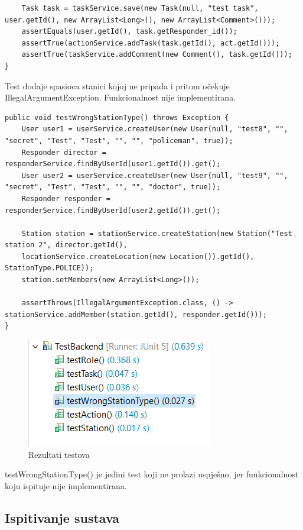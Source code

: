\begin{packed_enum}
\begin{lstlisting}
	Task task = taskService.save(new Task(null, "test task", user.getId(), new ArrayList<Long>(), new ArrayList<Comment>()));
	assertEquals(user.getId(), task.getResponder_id());
	assertTrue(actionService.addTask(task.getId(), act.getId()));
	assertTrue(taskService.addComment(new Comment(), task.getId()));
}
				\end{lstlisting}
				\item Test dodaje spasioca stanici kojoj ne pripada i pritom očekuje IllegalArgumentException. Funkcionalnost nije implementirana.
				\begin{lstlisting}
public void testWrongStationType() throws Exception {
	User user1 = userService.createUser(new User(null, "test8", "", "secret", "Test", "Test", "", "", "policeman", true));
	Responder director = responderService.findByUserId(user1.getId()).get();
	User user2 = userService.createUser(new User(null, "test9", "", "secret", "Test", "Test", "", "", "doctor", true));
	Responder responder = responderService.findByUserId(user2.getId()).get();
	
	Station station = stationService.createStation(new Station("Test station 2", director.getId(),
	locationService.createLocation(new Location()).getId(), StationType.POLICE));
	station.setMembers(new ArrayList<Long>());
	
	assertThrows(IllegalArgumentException.class, () -> stationService.addMember(station.getId(), responder.getId()));
}
				\end{lstlisting}
			\end{packed_enum}
			
			\begin{figure}[H]
				\includegraphics[scale=0.9]{slike/test.png}
				\centering
				\caption{Rezultati testova}
				\label{fig:test}
			\end{figure}
			
			testWrongStationType() je jedini test koji ne prolazi uspješno, jer funkcionalnost koju ispituje nije implementirana.
		
			\subsection{Ispitivanje sustava}
			
